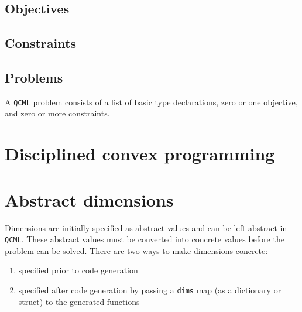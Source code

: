 \documentclass[11pt]{article}
\def\qcml{\texttt{QCML}\xspace}
\newcommand{\reals}{{\mbox{\bf R}}}
\begin{document}

% 
% 
% 
% 
% 


\subsection{Objectives}
\subsection{Constraints}
\subsection{Problems}
A \qcml problem consists of a list of basic type declarations, zero or one
objective, and zero or more constraints. 

\section{Disciplined convex programming}
\label{s-dcp}

\section{Abstract dimensions}
\label{s-abstract-dims}
Dimensions are initially specified as abstract values and can be left abstract
in \qcml. These abstract values must be converted into concrete values
before the problem can be solved. There are two ways to make dimensions 
concrete:
\begin{enumerate}
\item specified prior to code generation
\item specified after code generation by passing a {\tt dims} map (as a
  dictionary or struct) to the generated functions %
\end{enumerate}
\end{document}
